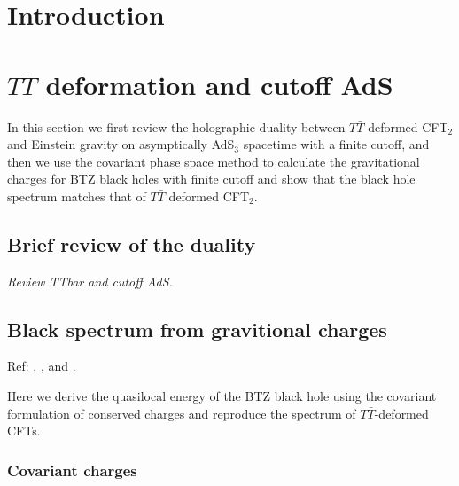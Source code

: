 \documentclass[11pt,a4paper,utf8]{article}
\begin{document}
	
\pagebreak

\section{Introduction}

\section{$T \bar T$ deformation and cutoff AdS}
In this section we first review the holographic duality between $T\bar T$ deformed CFT$_2$ and Einstein gravity on asymptically AdS$_3$ spacetime with a finite cutoff,  and then we use the covariant phase space method to calculate the gravitational charges for BTZ black holes with finite cutoff and show that the black hole spectrum matches that of  $T\bar T$ deformed CFT$_2$. 

\subsection{Brief review of the duality}

{\color{red}\itshape Review TTbar and cutoff AdS. }


\subsection{Black spectrum from gravitional charges}
	Ref: \textcite{Wald:1993nt,Iyer:1994ys,Iyer:1995kg}, \textcite{Lewkowycz:2013nqa}, and \textcite{Faulkner:2013ana}.
	
	Here we derive the quasilocal energy of the BTZ black hole using the covariant formulation of conserved charges and reproduce the spectrum of $T\bar{T}$-deformed CFTs. 
	
\subsubsection*{Covariant charges}
	
\end{document}
